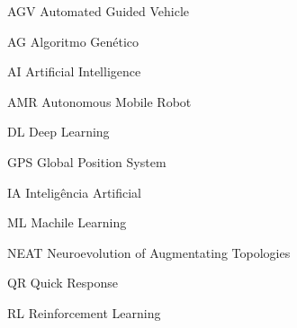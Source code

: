 \begin{siglas}
    \item[AGV] Automated Guided Vehicle
    \item[AG] Algoritmo Genético
    \item[AI] Artificial Intelligence
    \item[AMR] Autonomous Mobile Robot
    \item[DL] Deep Learning
    \item[GPS] Global Position System
    \item[IA] Intelig{\^e}ncia Artificial
    \item[ML] Machile Learning
    \item[NEAT] Neuroevolution of Augmentating Topologies
    \item[QR] Quick Response
    \item[RL] Reinforcement Learning
\end{siglas}
